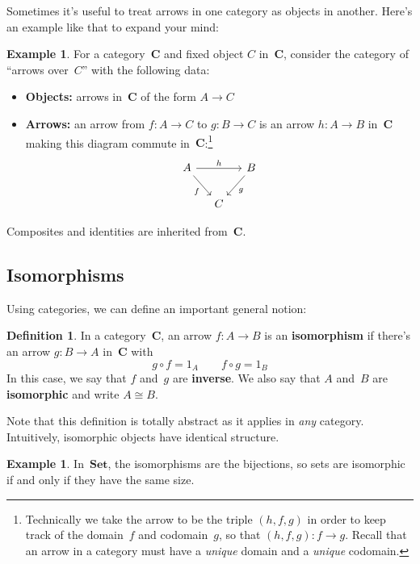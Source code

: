 \documentclass[letterpaper,12pt]{article}
\newcommand{\iso}{\cong}
\newcommand{\after}{\circ}
\newcommand{\cat}[1]{\mathbf{#1}}
\newcommand{\Set}{\cat{Set}}
\newcommand{\textdefn}{\textbf}
\theoremstyle{definition}
\newtheorem{defn}[equation]{Definition}
\newtheorem{exmp}[equation]{Example}
\theoremstyle{plain}
\numberwithin{equation}{section}
\begin{document}
Sometimes it's useful to treat arrows in one category as objects in another. Here's an example like that to expand your mind:
\begin{exmp}
For a category~\(\cat{C}\) and fixed object \(C\) in~\(\cat{C}\), consider the category of ``arrows over~\(C\)'' with the following data:
\begin{itemize}
\item \textbf{Objects:} arrows in~\(\cat{C}\) of the form \(A\to C\)
\item \textbf{Arrows:} an arrow from \(f:A\to C\) to \(g:B\to C\) is an arrow \(h:A\to B\) in~\(\cat{C}\) making this diagram commute in~\(\cat{C}\):\footnote{Technically we take the arrow to be the triple \((h,f,g)\) in order to keep track of the domain~\(f\) and codomain~\(g\), so that \((h,f,g):f\to g\). Recall that an arrow in a category must have a \emph{unique} domain and a \emph{unique} codomain.}
\begin{equation*}
\begin{tikzcd}[column sep=small]
A \ar[rd, "f"'] \ar[rr, "h"] && B \ar[ld, "g"]\\
  & C &
\end{tikzcd}
\end{equation*}
\end{itemize}
Composites and identities are inherited from~\(\cat{C}\).
\label{exmp:slicecat}
\end{exmp}

\subsection{Isomorphisms}
Using categories, we can define an important general notion:
\begin{defn}
In a category~\(\cat{C}\), an arrow \(f:A\to B\) is an \textdefn{isomorphism} if there's an arrow \(g:B\to A\) in~\(\cat{C}\) with
\[g\after f=1_A\qquad f\after g=1_B\]
In this case, we say that \(f\) and~\(g\) are \textdefn{inverse}. We also say that \(A\) and~\(B\) are \textdefn{isomorphic} and write \(A\iso B\).
\end{defn}
\noindent Note that this definition is totally abstract as it applies in \emph{any} category. Intuitively, isomorphic objects have identical structure.

\begin{exmp}
In~\(\Set\), the isomorphisms are the bijections, so sets are isomorphic if and only if they have the same size.
\end{exmp}
\end{document}
